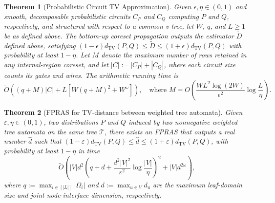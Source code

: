 \documentclass[10pt,a4paper]{amsart}
\newtheorem{theorem}{Theorem}
\begin{document}
\begin{theorem}[Probabilistic Circuit TV Approximation]
\label{thm:pc_fpras}
Given $\epsilon, \eta \in (0, 1)$ and smooth, decomposable probabilistic circuits $C_P$ and $C_Q$ computing $P$ and $Q$, respectively, and structured with respect to a common v-tree, let $W$, $q$, and $L\geq1$ be as defined above. The bottom-up coreset propagation outputs the estimator $\widetilde{D}$ defined above, satisfying $(1-\epsilon)d_{\mathrm{TV}}(P,Q) \le \widetilde{D} \le (1+\epsilon)d_{\mathrm{TV}}(P,Q)$ with probability at least $1-\eta$. Let $M$ denote the maximum number of rows retained in any
internal-region coreset, and
let $|C|:=|C_P|+|C_Q|$, where each circuit size counts its gates and wires. The arithmetic running time is
\[
\widetilde{O}\!\left((q+M)|C|+L\left[W(q+M)^2+W^\omega\right]\right),
\quad\text{where }
M=O\!\left(
\frac{WL^2\log(2W)}{\epsilon^2}
\log\frac{L}{\eta}
\right).
\]
\end{theorem}

\begin{theorem}[FPRAS for TV-distance between weighted tree automata]\label{thm:wta_fpras}
Given $\varepsilon,\eta\in(0,1)$, two distributions $P$ and $Q$ induced by two nonnegative weighted tree automata on the same tree $\mathcal{T}$, there exists an FPRAS that outputs a real number $\widehat d$ such that
$(1-\varepsilon)d_{\mathrm{TV}}(P,Q)\leq\widehat d\leq(1+\varepsilon)d_{\mathrm{TV}}(P,Q)$, with probability at least $1-\eta$ in time
$$
\widetilde{O}\!\left(|V|d^2\left(q+d+\frac{d^2|V|^2}{\varepsilon^2}\log\frac{|V|}{\eta}\right)^2+|V|d^{2\omega}\right),
$$
where $q:=\max_{i\in[|L|]}|\Omega_i|$ and $d:=\max_{u\in V} d_u$ are the maximum leaf-domain size and joint node-interface dimension, respectively.
\end{theorem}
\end{document}
